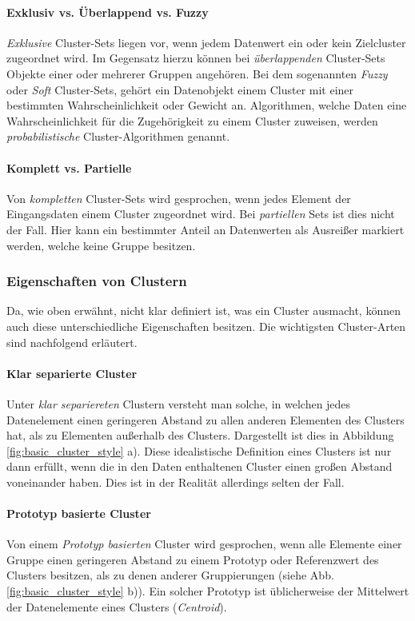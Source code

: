 \paragraph{Exklusiv vs. Überlappend vs. Fuzzy}
\textit{Exklusive} Cluster-Sets liegen vor, wenn jedem Datenwert ein oder kein Zielcluster zugeordnet wird.
Im Gegensatz hierzu können bei \textit{überlappenden} Cluster-Sets Objekte einer oder mehrerer Gruppen angehören.
Bei dem sogenannten \textit{Fuzzy} oder \textit{Soft} Cluster-Sets, gehört ein Datenobjekt einem Cluster
mit einer bestimmten Wahrscheinlichkeit oder Gewicht an. Algorithmen, welche Daten eine
Wahrscheinlichkeit für die Zugehörigkeit zu einem Cluster zuweisen, werden \textit{probabilistische}
Cluster-Algorithmen genannt.

\paragraph{Komplett vs. Partielle}
Von \textit{kompletten} Cluster-Sets wird gesprochen, wenn jedes Element der Eingangsdaten einem Cluster zugeordnet wird.
Bei \textit{partiellen} Sets ist dies nicht der Fall. Hier kann ein bestimmter Anteil an Datenwerten als Ausreißer markiert
werden, welche keine Gruppe besitzen.


\subsubsection{Eigenschaften von Clustern}

Da, wie oben erwähnt, nicht klar definiert ist, was ein Cluster ausmacht, können auch diese unterschiedliche Eigenschaften
besitzen. Die wichtigsten Cluster-Arten sind nachfolgend erläutert.

\paragraph{Klar separierte Cluster}
Unter \textit{klar separiereten} Clustern versteht man solche, in welchen jedes Datenelement einen geringeren
Abstand zu allen anderen Elementen des Clusters hat, als zu Elementen außerhalb des Clusters.
Dargestellt ist dies in Abbildung \ref{fig:basic_cluster_style} a). Diese idealistische Definition eines
Clusters ist nur dann erfüllt, wenn die in den Daten enthaltenen Cluster einen großen Abstand voneinander haben.
Dies ist in der Realität allerdings selten der Fall.

\paragraph{Prototyp basierte Cluster}
Von einem \textit{Prototyp basierten} Cluster wird gesprochen, wenn alle Elemente einer Gruppe einen
geringeren Abstand zu einem Prototyp oder Referenzwert des Clusters besitzen, als zu denen anderer Gruppierungen (siehe Abb. \ref{fig:basic_cluster_style} b)).
Ein solcher Prototyp ist üblicherweise der Mittelwert der Datenelemente eines Clusters (\textit{Centroid}).

